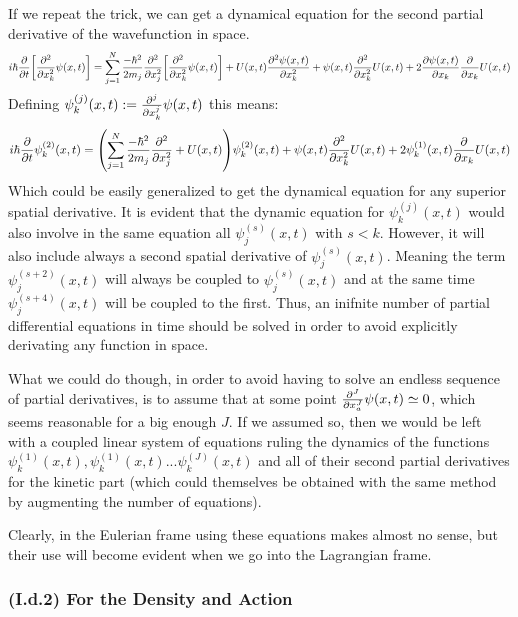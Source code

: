 \documentclass[11pt, a4paper]{article} %
\begin{document}
If we repeat the trick, we can get a dynamical equation for the second partial derivative of the wavefunction in space.
\begin{equation}
i\hbar \pdv{}{t}\qty[\pdv[2]{}{x_k}\psi(x,t)] = \sum_{j=1}^N\frac{-\hbar^2}{2m_j}\pdv[2]{}{x_j}\qty[\pdv[2]{}{x_k}\psi(x,t)]+U(x,t)\pdv[2]{\psi(x,t)}{x_k} + \psi(x,t)\pdv[2]{}{x_k}U(x,t)+2\pdv{\psi(x,t)}{x_k}\pdv{}{x_k}U(x,t)
\end{equation}
Defining $\psi^{(j)}_k(x,t):=\pdv[j]{}{x_k}\psi(x,t)$ this means:
\begin{equation}
i\hbar \pdv{}{t}\psi^{(2)}_k(x,t) = \qty(\sum_{j=1}^N\frac{-\hbar^2}{2m_j}\pdv[2]{}{x_j}+U(x,t))\psi^{(2)}_k(x,t)+ \psi(x,t)\pdv[2]{}{x_k}U(x,t)+2\psi^{(1)}_k(x,t)\pdv{}{x_k}U(x,t)
\end{equation}
Which could be easily generalized to get the dynamical equation for any superior spatial derivative. It is evident that the dynamic equation for $\psi^{(j)}_k(x,t)$ would also involve in the same equation all $\psi^{(s)}_j(x,t)$ with $s<k$. However, it will also include always a second spatial derivative of $\psi^{(s)}_j(x,t)$. Meaning the term $\psi^{(s+2)}_j(x,t)$ will always be coupled to $\psi^{(s)}_j(x,t)$ and at the same time $\psi^{(s+4)}_j(x,t)$ will be coupled to the first. Thus, an inifnite number of partial differential equations in time should be solved in order to avoid explicitly derivating any function in space. 

What we could do though, in order to avoid having to solve an endless sequence of partial derivatives, is to assume that at some point $\pdv[J]{}{x_a}\psi(x,t)\simeq 0$, which seems reasonable for a big enough $J$. If we assumed so, then we would be left with a coupled linear system of equations ruling the dynamics of the functions $\psi^{(1)}_k(x,t),\psi^{(1)}_k(x,t)...\psi^{(J)}_k(x,t)$ and all of their second partial derivatives for the kinetic part (which could themselves be obtained with the same method by augmenting the number of equations).

Clearly, in the Eulerian frame using these equations makes almost no sense, but their use will become evident when we go into the Lagrangian frame.

\subsubsection*{(I.d.2) For the Density and Action}
\end{document}
